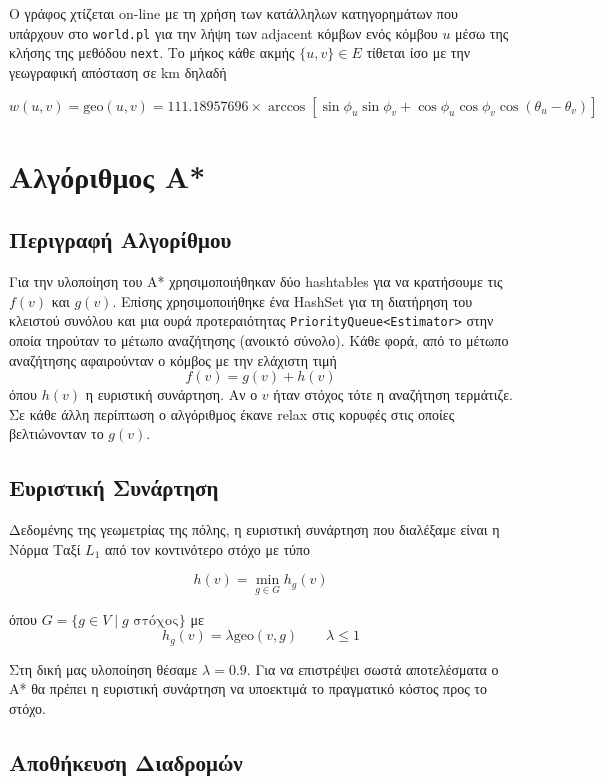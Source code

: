 \documentclass[a4paper,12pt]{article}
\begin{document}
Ο γράφος χτίζεται on-line με τη χρήση των κατάλληλων κατηγορημάτων που υπάρχουν στο \texttt{world.pl} για την λήψη των adjacent κόμβων ενός κόμβου $u$ μέσω της κλήσης της μεθόδου \texttt{next}. Το μήκος κάθε ακμής $\{u, v\} \in E$ τίθεται ίσο με την γεωγραφική απόσταση σε km δηλαδή 

$$w(u, v) = \mathrm{geo}(u, v) = 111.18957696 \times \arccos \left [ \sin \phi_u \sin \phi_v + \cos \phi_u \cos \phi_v \cos (\theta_u - \theta_v) \right ]$$



\section{Αλγόριθμος Α*}

\subsection{Περιγραφή Αλγορίθμου}
Για την υλοποίηση του Α* χρησιμοποιήθηκαν δύο hashtables για να κρατήσουμε τις $f(v)$ και $g(v)$. Επίσης χρησιμοποιήθηκε ένα HashSet για τη διατήρηση του κλειστού συνόλου και μια ουρά προτεραιότητας \texttt{PriorityQueue<Estimator>} στην οποία τηρούταν το μέτωπο αναζήτησης (ανοικτό σύνολο). Κάθε φορά, από το μέτωπο αναζήτησης αφαιρούνταν ο κόμβος με την ελάχιστη τιμή $$f(v) = g(v) + h(v)$$ όπου $h(v)$ η ευριστική συνάρτηση. Αν ο $v$ ήταν στόχος τότε η αναζήτηση τερμάτιζε. Σε κάθε άλλη περίπτωση ο αλγόριθμος έκανε relax στις κορυφές στις οποίες βελτιώνονταν το $g(v)$. 

\subsection{Ευριστική Συνάρτηση}

Δεδομένης της γεωμετρίας της πόλης, η ευριστική συνάρτηση που διαλέξαμε είναι η Νόρμα Ταξί $L_1$ από τον κοντινότερο στόχο με τύπο 

$$h(v) = \min_{g \in G} h_g(v)$$

όπου $G = \{ g \in V \mid g \text{ στόχος} \}$ με $$h_g(v) = \lambda \mathrm{geo}(v, g) \qquad \lambda \le 1$$
 
Στη δική μας υλοποίηση θέσαμε $\lambda=0.9$. Για να επιστρέψει σωστά αποτελέσματα ο Α* θα πρέπει η ευριστική συνάρτηση να υποεκτιμά το πραγματικό κόστος προς το στόχο.
\subsection{Αποθήκευση Διαδρομών} 
\end{document}

